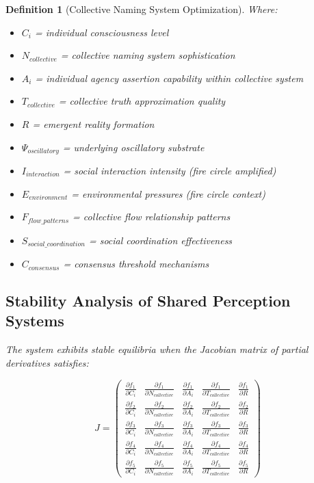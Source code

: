 \documentclass[12pt]{article}
\newtheorem{definition}{Definition}
\begin{document}
\begin{definition}[Collective Naming System Optimization]
Where:
\begin{itemize}
\item $C_i$ = individual consciousness level
\item $N_{collective}$ = collective naming system sophistication
\item $A_i$ = individual agency assertion capability within collective system
\item $T_{collective}$ = collective truth approximation quality
\item $R$ = emergent reality formation
\item $\Psi_{oscillatory}$ = underlying oscillatory substrate
\item $I_{interaction}$ = social interaction intensity (fire circle amplified)
\item $E_{environment}$ = environmental pressures (fire circle context)
\item $F_{flow\_patterns}$ = collective flow relationship patterns
\item $S_{social\_coordination}$ = social coordination effectiveness
\item $C_{consensus}$ = consensus threshold mechanisms
\end{itemize}

\subsection{Stability Analysis of Shared Perception Systems}

The system exhibits stable equilibria when the Jacobian matrix of partial derivatives satisfies:

$$J = \begin{pmatrix}
\frac{\partial f_1}{\partial C_i} & \frac{\partial f_1}{\partial N_{collective}} & \frac{\partial f_1}{\partial A_i} & \frac{\partial f_1}{\partial T_{collective}} & \frac{\partial f_1}{\partial R} \\
\frac{\partial f_2}{\partial C_i} & \frac{\partial f_2}{\partial N_{collective}} & \frac{\partial f_2}{\partial A_i} & \frac{\partial f_2}{\partial T_{collective}} & \frac{\partial f_2}{\partial R} \\
\frac{\partial f_3}{\partial C_i} & \frac{\partial f_3}{\partial N_{collective}} & \frac{\partial f_3}{\partial A_i} & \frac{\partial f_3}{\partial T_{collective}} & \frac{\partial f_3}{\partial R} \\
\frac{\partial f_4}{\partial C_i} & \frac{\partial f_4}{\partial N_{collective}} & \frac{\partial f_4}{\partial A_i} & \frac{\partial f_4}{\partial T_{collective}} & \frac{\partial f_4}{\partial R} \\
\frac{\partial f_5}{\partial C_i} & \frac{\partial f_5}{\partial N_{collective}} & \frac{\partial f_5}{\partial A_i} & \frac{\partial f_5}{\partial T_{collective}} & \frac{\partial f_5}{\partial R}
\end{pmatrix}$$


\end{definition}
\end{document}
